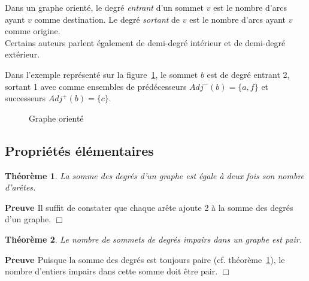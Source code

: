 \documentclass[11pt,a4paper]{report}
\newtheorem{theorem}{Théorème}
\newcommand{\bpr}{{\bf {Preuve }}}
\newcommand{\epr}{\hfill$\Box$\\}
\begin{document}
Dans un graphe orient\'e, le degr\'e {\em entrant} d'un sommet $v$ 
est le nombre d'arcs ayant $v$ comme destination. Le degr\'e {\em sortant}
de $v$ est le nombre d'arcs ayant $v$ comme origine.\\
Certains auteurs parlent \'egalement de demi-degr\'e int\'erieur et de 
demi-degr\'e ext\'erieur.

Dans l'exemple représenté sur la figure~\ref{fig:Goriente}, le sommet $b$ est de degré entrant 2, sortant 1 avec comme ensembles de prédécesseurs $Adj^-(b) = \{a, f\}$ et successeurs $Adj^+(b) = \{c\}$.

\begin{figure}[H]
\begin{center}
\caption{Graphe orienté}\label{fig:Goriente}
\end{center}
\end{figure}

\subsection {Propriétés élémentaires}




\begin{theorem}\label{th:degre}
La somme des degr\'es d'un graphe est \'egale \`a deux fois son nombre 
d'ar\^etes. 
\end{theorem}
\bpr
Il suffit de constater que chaque arête ajoute 2 à la somme des degrés d'un graphe. 
\epr

\begin{theorem}
Le nombre de sommets de degr\'es impairs dans un graphe est pair.
\end{theorem}
\bpr
Puisque la somme des degrés est toujours paire (cf. théorème~\ref{th:degre}), le nombre d'entiers impairs dans cette somme doit être pair.
\epr
\end{document}
